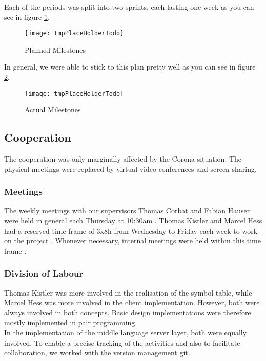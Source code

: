 Each of the periods was split into two sprints, each lasting one week
as you can see in figure \ref{fig:planned_milestones}.

\begin{figure}[H]
    \centering
    \texttt{[image: tmpPlaceHolderTodo]}
    \caption{Planned Milestones}
    \label{fig:planned_milestones}
\end{figure}

In general, we were able to stick to this plan pretty well as you can see in figure \ref{fig:actual_milestones}.

\begin{figure}[H]
    \centering
    \texttt{[image: tmpPlaceHolderTodo]}
    \caption{Actual Milestones}
    \label{fig:actual_milestones}
\end{figure}

\subsection{Cooperation}
The cooperation was only marginally affected by the Corona situation.
The physical meetings were replaced by virtual video conferences and screen sharing.

\subsubsection{Meetings}
The weekly meetings with our supervisors Thomas Corbat and Fabian Hauser were held in general each Thursday at 10:30am \cite{projectplan}.
Thomas Kistler and Marcel Hess had a reserved time frame of 3x8h from Wednesday to
Friday each week to work on the project \cite{projectplan}.
Whenever necessary, internal meetings were held within this time frame \cite{projectplan}.

\subsubsection{Division of Labour}
Thomas Kistler was more involved in the realisation of the symbol table,
while Marcel Hess was more involved in the client implementation.
However, both were always involved in both concepts.
Basic design implementations were therefore mostly implemented in pair programming.\\

In the implementation of the middle language server layer, both were equally involved.
To enable a precise tracking of the activities and also to facilitate collaboration,
we worked with the version management git.

